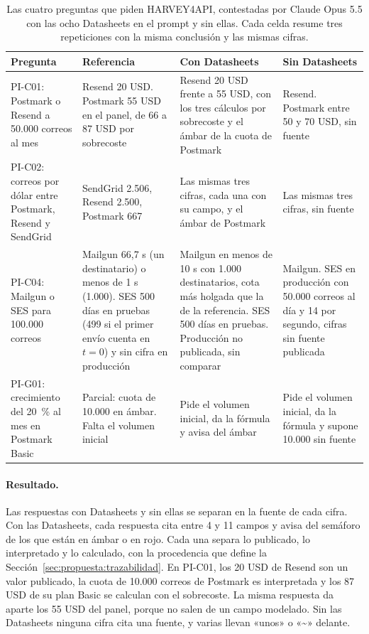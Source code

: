 \begin{table}[tbp]
\centering
\small
\renewcommand{\arraystretch}{1.15}
\begin{tabular}{|>{\raggedright\arraybackslash}p{2.6cm}|>{\raggedright\arraybackslash}p{3.4cm}|>{\raggedright\arraybackslash}p{3.6cm}|>{\raggedright\arraybackslash}p{3.6cm}|}
\hline
\textbf{Pregunta} & \textbf{Referencia} & \textbf{Con Datasheets} & \textbf{Sin Datasheets} \\
\hline
PI-C01: Postmark o Resend a 50.000 correos al mes & Resend 20 USD. Postmark 55 USD en el panel, de 66 a 87 USD por sobrecoste & Resend 20 USD frente a 55 USD, con los tres cálculos por sobrecoste y el ámbar de la cuota de Postmark & Resend. Postmark entre 50 y 70 USD, sin fuente \\
\hline
PI-C02: correos por dólar entre Postmark, Resend y SendGrid & SendGrid 2.506, Resend 2.500, Postmark 667 & Las mismas tres cifras, cada una con su campo, y el ámbar de Postmark & Las mismas tres cifras, sin fuente \\
\hline
PI-C04: Mailgun o SES para 100.000 correos & Mailgun 66,7 s (un destinatario) o menos de 1 s (1.000). SES 500 días en pruebas (499 si el primer envío cuenta en $t = 0$) y sin cifra en producción & Mailgun en menos de 10 s con 1.000 destinatarios, cota más holgada que la de la referencia. SES 500 días en pruebas. Producción no publicada, sin comparar & Mailgun. SES en producción con 50.000 correos al día y 14 por segundo, cifras sin fuente publicada \\
\hline
PI-G01: crecimiento del 20~\% al mes en Postmark Basic & Parcial: cuota de 10.000 en ámbar. Falta el volumen inicial & Pide el volumen inicial, da la fórmula y avisa del ámbar & Pide el volumen inicial, da la fórmula y supone 10.000 sin fuente \\
\hline
\end{tabular}
\caption{Las cuatro preguntas que piden HARVEY4API, contestadas por Claude Opus 5.5 con las ocho Datasheets en el prompt y sin ellas. Cada celda resume tres repeticiones con la misma conclusión y las mismas cifras.}
\label{tab:comparacion:harvey}
\end{table}

\paragraph{Resultado.}

Las respuestas con Datasheets y sin ellas se separan en la fuente de cada cifra.
Con las Datasheets, cada respuesta cita entre 4 y 11 campos y avisa del semáforo de los que están en ámbar o en rojo.
Cada una separa lo publicado, lo interpretado y lo calculado, con la procedencia que define la Sección~\ref{sec:propuesta:trazabilidad}.
En PI-C01, los 20 USD de Resend son un valor publicado, la cuota de 10.000 correos de Postmark es interpretada y los 87 USD de su plan Basic se calculan con el sobrecoste.
La misma respuesta da aparte los 55 USD del panel, porque no salen de un campo modelado.
Sin las Datasheets ninguna cifra cita una fuente, y varias llevan «unos» o «\textasciitilde{}» delante.

